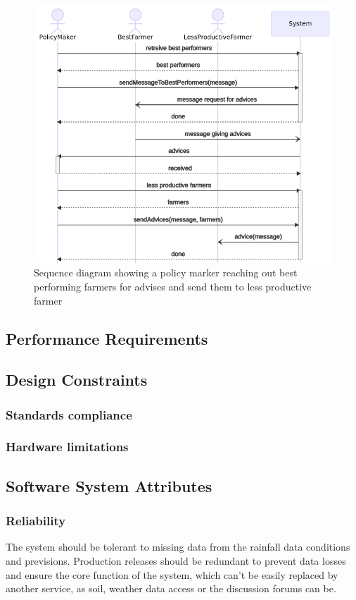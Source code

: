\begin{figure}[H]
	\centering
	\includegraphics[width=\textwidth]{Images/seq-policy-farmers.png}
	\caption{\label{fig:seqpolicymaker} Sequence diagram showing a policy marker reaching out best performing farmers for advises and send them to less productive farmer}
\end{figure}

\subsection{Performance Requirements}

\subsection{Design Constraints}
\subsubsection{Standards compliance}
\subsubsection{Hardware limitations}
\subsection{Software System Attributes}
\subsubsection{Reliability}
The system should be tolerant to missing data from the rainfall data conditions and previsions. Production releases should be redundant to prevent data losses and ensure the core function of the system, which can't be easily replaced by another service, as soil, weather data access or the discussion forums can be.

